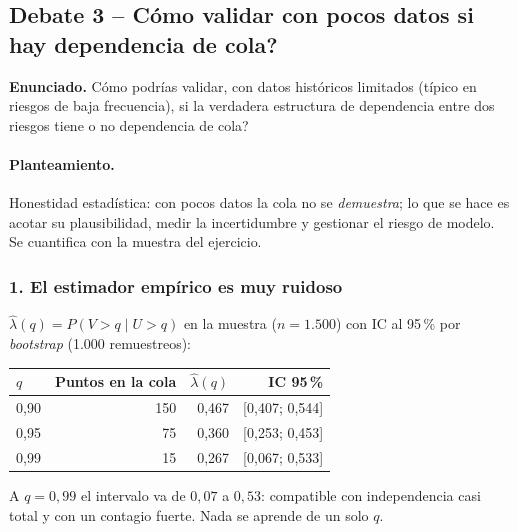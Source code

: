 \documentclass[a4paper,12pt]{article}
\begin{document}
\subsection{Debate 3 -- \textquestiondown{}Cómo validar con pocos datos si hay dependencia de cola?}

\noindent\textbf{Enunciado.} \textquestiondown{}Cómo podrías validar, con datos históricos limitados (típico en riesgos de baja frecuencia), si la verdadera estructura de dependencia entre dos riesgos tiene o no dependencia de cola?

\paragraph{Planteamiento.} Honestidad estadística: con pocos datos la cola no se \emph{demuestra}; lo que se hace es acotar su plausibilidad, medir la incertidumbre y gestionar el riesgo de modelo. Se cuantifica con la muestra del ejercicio.

\subsubsection*{1. El estimador empírico es muy ruidoso}
$\hat\lambda(q)=P(V>q\mid U>q)$ en la muestra ($n=1.500$) con IC al 95\,\% por \emph{bootstrap} (1.000 remuestreos):
\begin{center}
\small
\begin{tabular}{lrrr}
\toprule
$q$ & Puntos en la cola & $\hat\lambda(q)$ & IC 95\,\%\\
\midrule
0,90 & 150 & 0,467 & [0,407; 0,544]\\
0,95 & 75 & 0,360 & [0,253; 0,453]\\
0,99 & 15 & 0,267 & [0,067; 0,533]\\
\bottomrule
\end{tabular}
\end{center}
A $q=0{,}99$ el intervalo va de $0{,}07$ a $0{,}53$: compatible con independencia casi total y con un contagio fuerte. Nada se aprende de un solo $q$.
\end{document}
